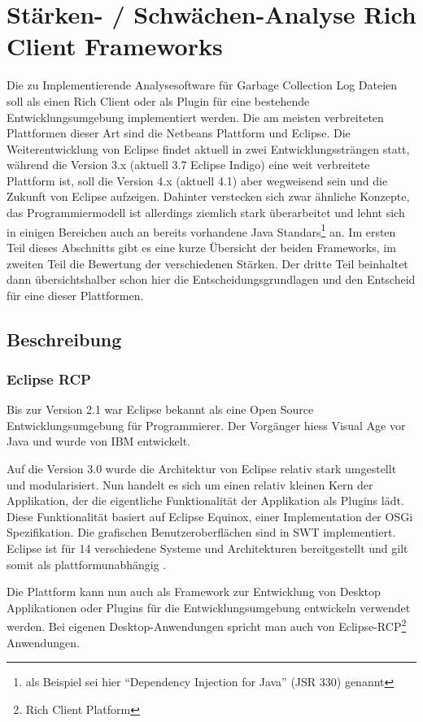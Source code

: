 \chapter{Stärken- / Schwächen-Analyse Rich Client Frameworks}
Die zu Implementierende Analysesoftware für Garbage Collection Log Dateien soll als einen Rich Client oder als Plugin für eine bestehende Entwicklungsumgebung implementiert werden. Die am meisten verbreiteten Plattformen dieser Art sind die Netbeans Plattform und Eclipse. Die Weiterentwicklung von Eclipse findet aktuell in zwei Entwicklungssträngen statt, während die Version 3.x (aktuell 3.7 Eclipse Indigo) eine weit verbreitete Plattform ist, soll die Version 4.x (aktuell 4.1) aber wegweisend sein und die Zukunft von Eclipse aufzeigen. Dahinter verstecken sich zwar ähnliche Konzepte, das Programmiermodell ist allerdings ziemlich stark überarbeitet und lehnt sich in einigen Bereichen auch an bereits vorhandene Java Standars\footnote{als Beispiel sei hier ``Dependency Injection for Java'' (JSR 330) genannt} an. Im ersten Teil dieses Abschnitts gibt es eine kurze Übersicht der beiden Frameworks, im zweiten Teil die Bewertung der verschiedenen Stärken. Der dritte Teil beinhaltet dann übersichtshalber schon hier die Entscheidungsgrundlagen und den Entscheid für eine dieser Plattformen. 

\section{Beschreibung}
\subsection{Eclipse RCP}
Bis zur Version 2.1 war Eclipse bekannt als eine Open Source Entwicklungsumgebung für Programmierer. Der Vorgänger hiess Visual Age vor Java und wurde von IBM entwickelt. 

Auf die Version 3.0 wurde die Architektur von Eclipse relativ stark umgestellt und modularisiert. Nun handelt es sich um einen relativ kleinen Kern der Applikation, der die eigentliche Funktionalität der Applikation als Plugins lädt. Diese Funktionalität basiert auf Eclipse Equinox, einer Implementation der OSGi Spezifikation. Die grafischen Benutzeroberflächen sind in SWT implementiert. Eclipse ist für 14 verschiedene Systeme und Architekturen bereitgestellt und gilt somit als plattformunabhängig \cite{wiki:eclipse}. 

Die Plattform kann nun auch als Framework zur Entwicklung von Desktop Applikationen oder Plugins für die Entwicklungsumgebung entwickeln verwendet werden. Bei eigenen Desktop-Anwendungen spricht man auch von Eclipse-RCP\footnote{Rich Client Platform} Anwendungen.



